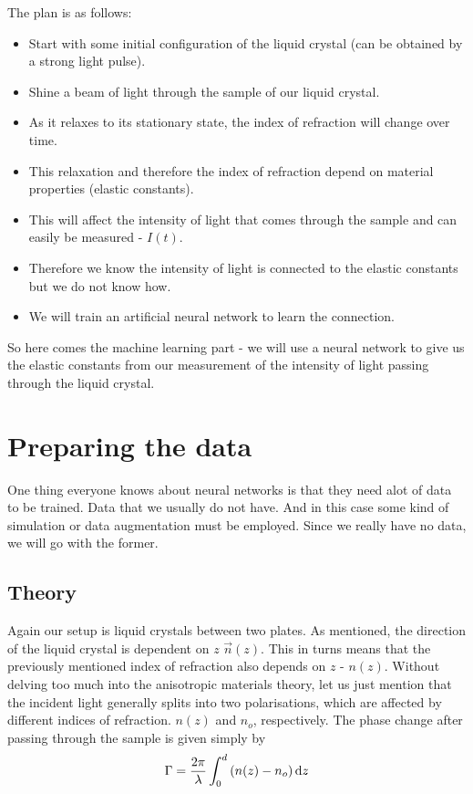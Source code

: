 \documentclass{article}
\begin{document}
The plan is as follows:
\begin{itemize}
\item Start with some initial configuration of the liquid crystal (can be obtained by a strong light pulse).
\item Shine a beam of light through the sample of our liquid crystal.
\item As it relaxes to its stationary state, the index of refraction will change over time.
\item This relaxation and therefore the index of refraction depend on material properties (elastic constants).
\item This will affect the intensity of light that comes through the sample and can easily be measured - $I(t)$.
\item Therefore we know the intensity of light is connected to the elastic constants but we do not know how.
\item We will train an artificial neural network to learn the connection.
\end{itemize}

So here comes the machine learning part - we will use a neural network to give us the elastic constants from our measurement of the intensity of light passing through the liquid crystal.

\section*{Preparing the data }

One thing everyone knows about neural networks is that they need alot of data to be trained. Data that we usually do not have. And in this case some kind of simulation or data augmentation must be employed. Since we really have no data, we will go with the former.

\subsection*{Theory}

Again our setup is liquid crystals between two plates. As mentioned, the direction of the liquid crystal is dependent on $z$ $\vec{n}(z)$. This in turns means that the previously mentioned index of refraction also depends on $z$ -  $n(z)$.
Without delving too much into the anisotropic materials theory, let us just mention that the incident light generally splits into two polarisations, which are affected by different indices of refraction. $n(z)$ and $n_o$, respectively.
The phase change after passing through the sample is given simply by 
\begin{equation*}
\Gamma = \frac{2 \pi}{\lambda} \int_0^d \left( n(z) - n_o \right) \textup{d}z
\end{equation*}
\end{document}
